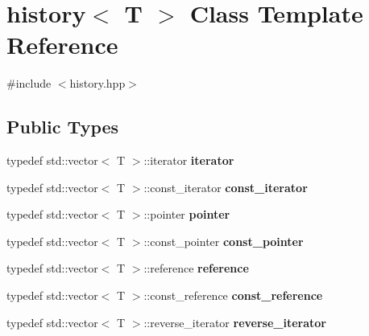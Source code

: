 \hypertarget{classhistory}{}\section{history$<$ T $>$ Class Template Reference}
\label{classhistory}


{\ttfamily \#include $<$history.\+hpp$>$}

\subsection*{Public Types}
\begin{DoxyCompactItemize}
\item 
typedef std\+::vector$<$ T $>$\+::iterator {\bfseries iterator}\hypertarget{classhistory_a6ddac373115175f4b2a6e9f1985871ca}{}\label{classhistory_a6ddac373115175f4b2a6e9f1985871ca}

\item 
typedef std\+::vector$<$ T $>$\+::const\+\_\+iterator {\bfseries const\+\_\+iterator}\hypertarget{classhistory_ab2b9c1d96293e620bda0bc87f943a568}{}\label{classhistory_ab2b9c1d96293e620bda0bc87f943a568}

\item 
typedef std\+::vector$<$ T $>$\+::pointer {\bfseries pointer}\hypertarget{classhistory_ab0fa36e34c7b1226344c46fc72ae0610}{}\label{classhistory_ab0fa36e34c7b1226344c46fc72ae0610}

\item 
typedef std\+::vector$<$ T $>$\+::const\+\_\+pointer {\bfseries const\+\_\+pointer}\hypertarget{classhistory_a826e2f6139edda30b9cdf420e81249d1}{}\label{classhistory_a826e2f6139edda30b9cdf420e81249d1}

\item 
typedef std\+::vector$<$ T $>$\+::reference {\bfseries reference}\hypertarget{classhistory_a30a010f65b1704d8404885eb72a1bab8}{}\label{classhistory_a30a010f65b1704d8404885eb72a1bab8}

\item 
typedef std\+::vector$<$ T $>$\+::const\+\_\+reference {\bfseries const\+\_\+reference}\hypertarget{classhistory_a9bad71d768796e37fb9c356ed457246a}{}\label{classhistory_a9bad71d768796e37fb9c356ed457246a}

\item 
typedef std\+::vector$<$ T $>$\+::reverse\+\_\+iterator {\bfseries reverse\+\_\+iterator}\hypertarget{classhistory_a3a878886f4497cba6247708a5cb8bbf6}{}\label{classhistory_a3a878886f4497cba6247708a5cb8bbf6}


\end{DoxyCompactItemize}
